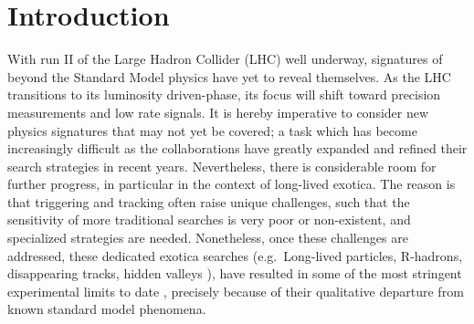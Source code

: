 \documentclass[10pt,aps,prd,nofootinbib,superscriptaddress,twocolumn,preprintnumbers,balancelastpage]{revtex4}
\begin{document}
\date{\today}

\maketitle

\section{Introduction}
\label{sec:intro}
With run II of the Large Hadron Collider (LHC) well underway, signatures of beyond the Standard Model physics have yet to reveal themselves. As the LHC transitions to its luminosity driven-phase, its focus will shift toward precision measurements and low rate signals. It is hereby imperative to consider new physics signatures that  may not yet be covered; a task which has become increasingly difficult as the collaborations have greatly expanded and refined their search strategies in recent years. Nevertheless, there is considerable room for further progress, in particular in the context of long-lived exotica. The reason is that triggering and tracking often raise unique challenges, such that the sensitivity of more traditional searches is very poor or non-existent, and specialized strategies are needed. Nonetheless, once these challenges are addressed, these dedicated exotica searches (e.g.~Long-lived particles, R-hadrons, disappearing tracks, hidden valleys \cite{Drees:1990yw, Hewett:2004nw, Arvanitaki:2005nq,Cirelli:2005uq,Strassler:2006im}), have resulted in some of the most stringent experimental limits to date \cite{Mehlhase:2016vuh, Khachatryan:2016sfv, ATLAS-CONF-2016-103,CMS:2014wda, ATLAS-CONF-2017-017,CMS:2014gxa}, precisely because of their qualitative departure from known standard model phenomena. 


%
%
\end{document}
